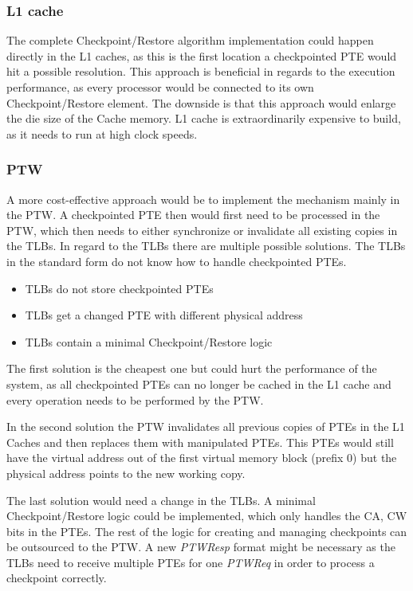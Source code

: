 \subsubsection{L1 cache}
The complete Checkpoint/Restore algorithm implementation could
happen directly in the L1 caches, as this is the first location a checkpointed
PTE would hit a possible resolution. This approach is beneficial in regards
to the execution performance, as every processor would be connected to
its own Checkpoint/Restore element. The downside is that this approach would
enlarge the die size of the Cache memory. L1 cache is extraordinarily
expensive to build, as it needs to run at high clock speeds.

\subsubsection{PTW}
A more cost-effective approach would be to implement the mechanism mainly
in the PTW. A checkpointed PTE then would first need to be processed
in the PTW, which then needs to either synchronize or invalidate
all existing copies in the TLBs.
In regard to the TLBs there are multiple possible solutions.
The TLBs in the standard form do not know how to handle checkpointed
PTEs.
\begin{itemize}
    \item TLBs do not store checkpointed PTEs
    \item TLBs get a changed PTE with different physical address
    \item TLBs contain a minimal Checkpoint/Restore logic
\end{itemize}

The first solution is the cheapest one but could hurt the performance
of the system, as all checkpointed PTEs can no longer be cached in
the L1 cache and every operation needs to be performed by the PTW.

In the second solution the PTW invalidates all previous copies
of PTEs in the L1 Caches and then replaces them with manipulated
PTEs. This PTEs would still have the virtual address out of the 
first virtual memory block (prefix 0) but the physical address
points to the new working copy.

The last solution would need a change in the TLBs. A minimal
Checkpoint/Restore logic could be implemented, which only handles
the CA, CW bits in the PTEs. The rest of the logic for creating
and managing checkpoints can be outsourced to the PTW.
A new \textit{PTWResp} format might be necessary as the TLBs need to receive
multiple PTEs for one \textit{PTWReq} in order to process a checkpoint
correctly.\newline

